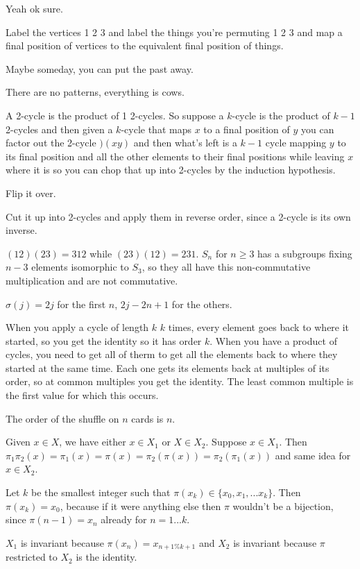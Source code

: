 \documentclass[11pt, oneside]{article}   	%
\begin{document}
\be
\item Yeah ok sure.
\item Label the vertices 1 2 3 and label the things you're permuting 1 2 3 and map a final position of vertices to the equivalent final position of things.
\item Maybe someday, you can put the past away.
\item There are no patterns, everything is cows.
\item A 2-cycle is the product of 1 2-cycles. So suppose a $k$-cycle is the product of $k-1$ 2-cycles and then given a $k$-cycle that maps $x$ to a final position of $y$ you can factor out the 2-cycle $)(x y)$ and then what's left is a $k-1$ cycle mapping $y$ to its final position and all the other elements to their final positions while leaving $x$ where it is so you can chop that up into 2-cycles by the induction hypothesis.
\item Flip it over.
\item Cut it up into 2-cycles and apply them in reverse order, since a 2-cycle is its own inverse.
\item $(1 2) (2 3) = 312$ while $(2 3) (1 2) = 231$. $S_n$ for $n\ge 3$ has a subgroups fixing $n-3$ elements isomorphic to $S_3$, so they all have this non-commutative multiplication and are not commutative.
\item $\sigma(j) = 2j$ for the first $n$, $2j -2n + 1$ for the others.
\item When you apply a cycle of length $k$ $k$ times, every element goes back to where it started, so you get the identity so it has order $k$. When you have a product of cycles, you need to get all of therm to get all the elements back to where they started at the same time. Each one gets its elements back at multiples of its order, so at common multiples you get the identity. The least common multiple is the first value for which this occurs.
\item The order of the shuffle on $n$ cards is $n$.
\item Given $x \in X$, we have either $x\in X_1$ or $X \in X_2$. Suppose $x \in X_1$. Then $\pi_1\pi_2(x) = \pi_1(x) = \pi(x) = \pi_2(\pi(x)) = \pi_2(\pi_1(x))$ and same idea for $x \in X_2$.
\item \be
\item Let $k$ be the smallest integer such that $\pi(x_k) \in \{x_0, x_1, ... x_k\}$. Then $\pi(x_k) = x_0$, because if it were anything else then $\pi$ wouldn't be a bijection, since $\pi(n-1) = x_n$ already for $n=1...k$.
\item $X_1$ is invariant because $\pi(x_n) = x_{n + 1 \% k + 1}$ and $X_2$ is invariant because $\pi$ restricted to $X_2$ is the identity.
\ee
\ee
\end{document}
